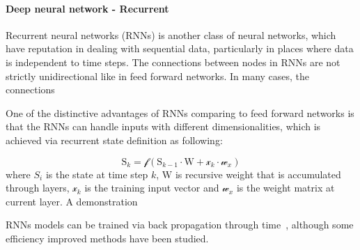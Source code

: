 \paragraph{Deep neural network - Recurrent}
Recurrent neural networks (RNNs) is another class of neural networks, which have reputation in dealing with sequential data, particularly in places where data is independent to time steps. The connections between nodes in RNNs are not strictly unidirectional like in feed forward networks. In many cases, the connections 
\par 
One of the distinctive advantages of RNNs comparing to feed forward networks is that the RNNs can handle inputs with different dimensionalities, which is achieved via recurrent state definition as following:

\begin{equation}
    \mathrm{S}_k = \mathcal{f}(\mathrm{S}_{k-1} \cdot \mathrm{W} + \mathcal{x}_k \cdot \mathcal{w}_x)
\end{equation}
where $S_i$ is the state at time step $k$, $\mathrm{W}$ is recursive weight that is accumulated through layers, $\mathcal{x}_k$ is the training input vector and $\mathcal{w}_x$ is the weight matrix at current layer. A demonstration 
\par 
RNNs models can be trained via back propagation through time~\cite{Goodfellow-et-al-2016}, although some efficiency improved methods have been studied.~\cite{963769,neco.1989,Gomez:2008:ANE:1390681.1390712}